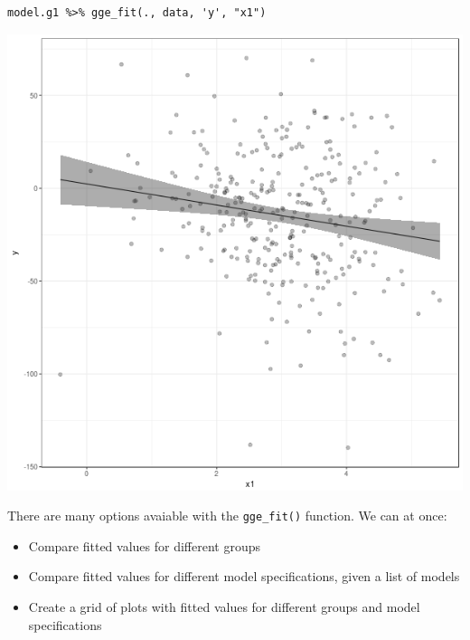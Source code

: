 \documentclass[a4paper]{article}
\begin{document}
\lstset{numbers=left,language=r,label= ,caption= ,captionpos=b}
\begin{lstlisting}
model.g1 %>% gge_fit(., data, 'y', "x1")
\end{lstlisting}

\begin{center}
\includegraphics[width=.9\linewidth]{fig-fitted-value-1.png}
\end{center}

There are many options avaiable with the \texttt{gge\_fit()} function. We can at once:
\begin{itemize}
\item Compare fitted values for different groups
\item Compare fitted values for different model specifications, given a list of models
\item Create a grid of plots with fitted values for different groups and model specifications
\end{itemize}
\end{document}
